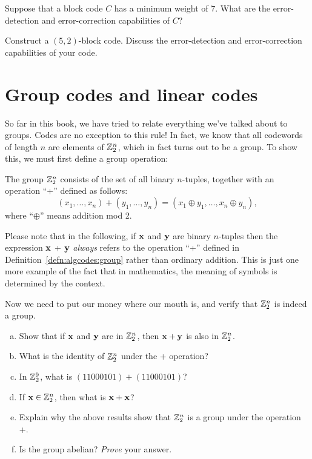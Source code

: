 \begin{exercise}{}
Suppose that a  block code $C$ has a minimum weight of 7. What are the
error-detection and error-correction capabilities of $C$?
\end{exercise}
 
 \begin{exercise}{}
Construct a $(5,2)$-block code. Discuss the error-detection and
error-correction capabilities of your code.
 \end{exercise}
 
\section{Group codes and linear codes}

So far in this book, we have tried to relate everything we've talked about to groups. Codes are no exception to this rule!  In fact, we know that all codewords of length $n$ are elements of ${\Bbb Z}_2^n$, which in fact turns out to be a group. To show this, we must first define a group operation:

\begin{defn}\label{defn:algcodes:group}
The group ${\Bbb Z}_2^n$ consists of the set of all binary $n$-tuples, together with an operation ``+'' defined as follows:
\[ (x_1, \ldots, x_n) +  (y_1, \ldots, y_n) = (x_1 \oplus y_1, \ldots, x_n \oplus y_n), \]
where ``$\oplus$'' means addition mod 2.
\end{defn}

\begin{rem}
Please note  that in the following, if  ${\bold x}$ and ${\bold y}$ are binary $n$-tuples then the expression ${\bold x}$ + ${\bold y}$ \emph{always} refers to the operation ``+'' defined in Definition~\ref{defn:algcodes:group} rather than ordinary addition. This is just one more example of the fact that in mathematics, the meaning of symbols is determined by the context.
\end{rem}

Now we need to put our money where our mouth is, and verify that 
${\Bbb Z}_2^n$ is indeed a group.

\begin{exercise}{}
\begin{enumerate}[(a)]
\item
Show that if ${\bold x}$ and ${\bold y}$ are in ${\Bbb Z}_2^n$, then ${\bold x} + {\bold y}$ is also in ${\Bbb Z}_2^n$.
\item
What is the identity of ${\Bbb
Z}_2^n$ under the + operation?
\item
In ${\Bbb Z}_2^9$, what is $(11000101) + (11000101)$?
\item
If ${\bold x} \in {\Bbb Z}_2^n$, then what is ${\bold x} + {\bold x}$?
\item
Explain why the above results show that ${\Bbb Z}_2^n$ is a group under the operation +.
\item
Is the group abelian? \emph{Prove} your answer.
\end{enumerate}
\end{exercise} 

